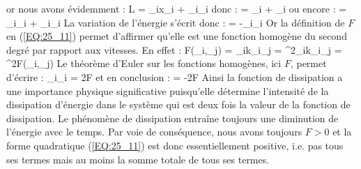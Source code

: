 \eea
or nous avons \'{e}videmment :
\benn
	L = \sum_{i}x_{i} + \sum_{i}_{i}
\eenn
donc :
\benn
	 = \sum_{i} + \sum_{i}
\eenn
ou encore :
\benn
	 = \sum_{i}_{i} + \sum_{i}_{i}
\eenn
La variation de l'\'{e}nergie s'\'{e}crit donc :
\benn
	 = -\sum_{i}_{i}
\eenn
Or la d\'{e}finition de $F$ en (\ref{EQ:25_11}) permet d'affirmer qu'elle est une fonction homog\`{e}ne du second degr\'{e} par rapport aux vitesses. En effet :
\benn
	F(\beta{}_{i},\beta{}_{j}) = \alpha_{ik}\beta{}_{i}\beta{}_{j} = \beta^{2}\alpha_{ik}_{i}_{j} = \beta^{2}F(_{i},_{j})
\eenn
Le th\'{e}or\`{e}me d'Euler sur les fonctions homog\`{e}nes, ici $F$, permet d'\'{e}crire :
\benn
	\sum_{i}_{i} = 2F
\eenn
et en conclusion :
\be
	 = -2F \label{EQ:25_13}
\ee
Ainsi la fonction de dissipation a une importance physique significative puisqu'elle d\'{e}termine l'intensit\'{e} de la dissipation d'\'{e}nergie dans le syst\`{e}me qui est deux fois la valeur de la fonction de dissipation. Le ph\'{e}nom\`{e}ne de dissipation entra\^{i}ne toujours une diminution de l'\'{e}nergie avec le temps. Par voie de cons\'{e}quence, nous avons toujours $F > 0$ et la forme quadratique (\ref{EQ:25_11}) est donc essentiellement positive, i.e. pas tous ses termes mais au moins la somme totale de tous ses termes.

